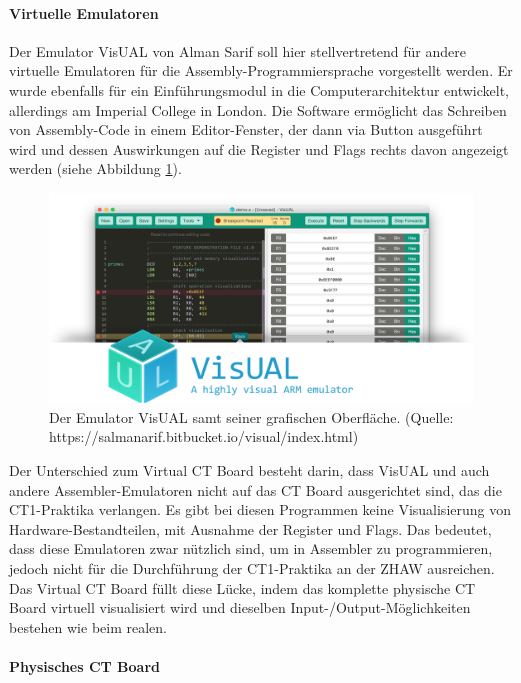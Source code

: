 \documentclass[10pt]{article}
\begin{document}
\paragraph{Virtuelle Emulatoren}
Der Emulator VisUAL von Alman Sarif soll hier stellvertretend für andere virtuelle Emulatoren für die Assembly-Programmiersprache vorgestellt werden. Er wurde ebenfalls für ein Einführungsmodul in die Computerarchitektur entwickelt, allerdings am Imperial College in London. Die Software ermöglicht das Schreiben von Assembly-Code in einem Editor-Fenster, der dann via Button ausgeführt wird und dessen Auswirkungen auf die Register und Flags rechts davon angezeigt werden (siehe Abbildung \ref{emulator}).
\begin{figure}[h]
\includegraphics[width=\textwidth]{visual_emulator}
\caption{Der Emulator VisUAL samt seiner grafischen Oberfläche. (Quelle: https://salmanarif.bitbucket.io/visual/index.html)}
\label{emulator}
\end{figure}
Der Unterschied zum \glqq Virtual CT Board\grqq{} besteht darin, dass VisUAL und auch andere Assembler-Emulatoren nicht auf das CT Board ausgerichtet sind, das die CT1-Praktika verlangen. Es gibt bei diesen Programmen keine Visualisierung von Hardware-Bestandteilen, mit Ausnahme der Register und Flags. Das bedeutet, dass diese Emulatoren zwar nützlich sind, um in Assembler zu programmieren, jedoch nicht für die Durchführung der CT1-Praktika an der ZHAW ausreichen. Das \glqq Virtual CT Board\grqq{} füllt diese Lücke, indem das komplette physische CT Board virtuell visualisiert wird und dieselben Input-/Output-Möglichkeiten bestehen wie beim realen.

\paragraph{Physisches CT Board} 
\end{document}
